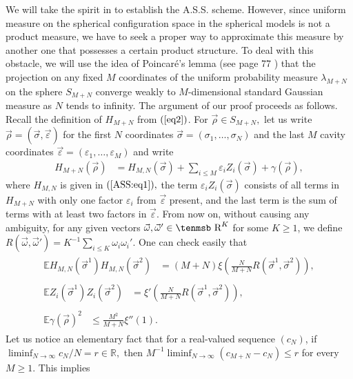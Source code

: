 \documentclass[12pt]{article}
\def\Bbb#1{\hbox{\tenmsb#1}}
\newcommand{\veps}{\vec{\varepsilon}}
\newcommand{\vsi}{{\vec{\sigma}}}
\newcommand{\vrho}{{\vec{\rho}}}
\newenvironment{Proof of lemma}{\noindent{\bf Proof of Lemma}}{\hfill$\Box$\newline}
\newenvironment{Proof of theorem}{\noindent{\bf Proof of Theorem}}{\hfill{\footnotesize${\square}$}\newline}
\newenvironment{Proof of theorems}{\noindent{\bf Proof of Theorems}}{\hfill$\Box$\newline}
\newenvironment{Proof of proposition}{\noindent{\bf Proof of Proposition}}{\hfill$\Box$\newline}
\newenvironment{Proof of propositions}{\noindent{\bf Proof of Propositions}}{\hfill$\Box$\newline}
\newenvironment{Proof of exercise}{\noindent{\it Proof of Exercise:}}{\hfill$\Box$}
\numberwithin{equation}{section}
\begin{document}
We will take the spirit in \cite{ASS03} to establish the A.S.S. scheme. However, since uniform measure on the spherical configuration space in the spherical models is not a product measure, we have to seek a proper way to approximate this measure by another one that possesses a certain product structure. To deal with this obstacle, we will use the idea of Poincar\'{e}'s lemma (see page 77 \cite{ST93}) that the projection on any fixed $M$ coordinates of the uniform probability measure $\lambda_{M+N}$ on the sphere $S_{M+N}$ converge weakly to $M$-dimensional standard Gaussian measure as $N$ tends to infinity. The argument of our proof proceeds as follows. Recall the definition of $H_{M+N}$ from $(\ref{eq2})$. For $\vrho\in S_{M+N},$ let us write $\vrho=(\vsi,\veps)$ for the first $N$ coordinates $\vsi=(\sigma_1,\ldots,\sigma_N)$ and the last $M$ cavity coordinates $\veps=(\varepsilon_1,\ldots,\varepsilon_M)$ and write
\begin{align*}
H_{M+N}(\vrho)&=H_{M,N}(\vsi)+\sum_{i\leq M}\varepsilon_i Z_i(\vsi)+\gamma(\vrho),
\end{align*}
where $H_{M,N}$ is given in $(\ref{ASS:eq1}),$ the term $\varepsilon_iZ_i(\vsi)$ consists of all terms in $H_{M+N}$ with only one factor $\varepsilon_i$ from $\veps$ present, and the last term is the sum of terms with at least two factors in $\veps.$ From now on, without causing any ambiguity, for any given vectors $\vec{\omega},\vec{\omega}'\in\Bbb{R}^K$ for some $K\geq 1$, we define $R(\vec{\omega},\vec{\omega}')=K^{-1}\sum_{i\leq K}\omega_i\omega_i'.$ One can check easily that
\begin{align}
\begin{split}
\label{ASS:eq2.1}
\mathbb{E}H_{M,N}(\vsi^1)H_{M,N}(\vsi^2)&=(M+N)\xi\left(\frac{N}{M+N}R(\vsi^1,\vsi^2)\right),
\end{split}\\
\begin{split}
\label{ASS:eq2.2}
\mathbb{E}Z_i(\vsi^1)Z_i(\vsi^2)&=\xi'\left(\frac{N}{M+N}R(\vsi^1,\vsi^2)\right),
\end{split}\\
\begin{split}
\label{ASS:eq2.3}
\mathbb{E}\gamma(\vrho)^2&\leq \frac{M^2}{M+N}\xi''(1).
\end{split}
\end{align}
Let us notice an elementary fact that for a real-valued sequence $(c_N)$, if $\liminf_{N\rightarrow\infty}c_N/N=r\in\mathbb{R},$ then $M^{-1}\liminf_{N\rightarrow\infty}(c_{M+N}-c_N)\leq r$ for every $M\geq 1.$ This implies 
\end{document}

